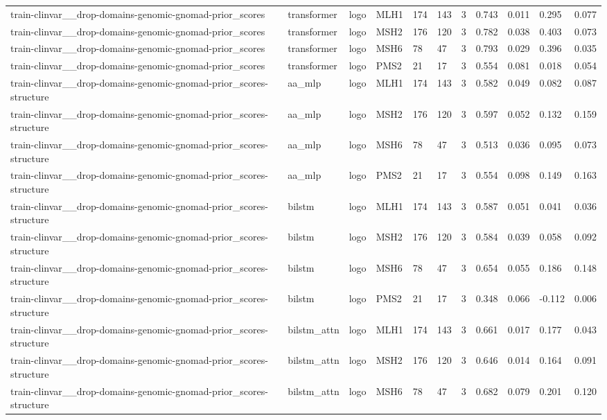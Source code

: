 \begin{table}[t]
\begin{tabular}{lllllllllll}
train-clinvar\_\_drop-domains-genomic-gnomad-prior\_scores & transformer & logo & MLH1 & 174 & 143 & 3 & 0.743 & 0.011 & 0.295 & 0.077 \\
train-clinvar\_\_drop-domains-genomic-gnomad-prior\_scores & transformer & logo & MSH2 & 176 & 120 & 3 & 0.782 & 0.038 & 0.403 & 0.073 \\
train-clinvar\_\_drop-domains-genomic-gnomad-prior\_scores & transformer & logo & MSH6 & 78 & 47 & 3 & 0.793 & 0.029 & 0.396 & 0.035 \\
train-clinvar\_\_drop-domains-genomic-gnomad-prior\_scores & transformer & logo & PMS2 & 21 & 17 & 3 & 0.554 & 0.081 & 0.018 & 0.054 \\
train-clinvar\_\_drop-domains-genomic-gnomad-prior\_scores-structure & aa\_mlp & logo & MLH1 & 174 & 143 & 3 & 0.582 & 0.049 & 0.082 & 0.087 \\
train-clinvar\_\_drop-domains-genomic-gnomad-prior\_scores-structure & aa\_mlp & logo & MSH2 & 176 & 120 & 3 & 0.597 & 0.052 & 0.132 & 0.159 \\
train-clinvar\_\_drop-domains-genomic-gnomad-prior\_scores-structure & aa\_mlp & logo & MSH6 & 78 & 47 & 3 & 0.513 & 0.036 & 0.095 & 0.073 \\
train-clinvar\_\_drop-domains-genomic-gnomad-prior\_scores-structure & aa\_mlp & logo & PMS2 & 21 & 17 & 3 & 0.554 & 0.098 & 0.149 & 0.163 \\
train-clinvar\_\_drop-domains-genomic-gnomad-prior\_scores-structure & bilstm & logo & MLH1 & 174 & 143 & 3 & 0.587 & 0.051 & 0.041 & 0.036 \\
train-clinvar\_\_drop-domains-genomic-gnomad-prior\_scores-structure & bilstm & logo & MSH2 & 176 & 120 & 3 & 0.584 & 0.039 & 0.058 & 0.092 \\
train-clinvar\_\_drop-domains-genomic-gnomad-prior\_scores-structure & bilstm & logo & MSH6 & 78 & 47 & 3 & 0.654 & 0.055 & 0.186 & 0.148 \\
train-clinvar\_\_drop-domains-genomic-gnomad-prior\_scores-structure & bilstm & logo & PMS2 & 21 & 17 & 3 & 0.348 & 0.066 & -0.112 & 0.006 \\
train-clinvar\_\_drop-domains-genomic-gnomad-prior\_scores-structure & bilstm\_attn & logo & MLH1 & 174 & 143 & 3 & 0.661 & 0.017 & 0.177 & 0.043 \\
train-clinvar\_\_drop-domains-genomic-gnomad-prior\_scores-structure & bilstm\_attn & logo & MSH2 & 176 & 120 & 3 & 0.646 & 0.014 & 0.164 & 0.091 \\
train-clinvar\_\_drop-domains-genomic-gnomad-prior\_scores-structure & bilstm\_attn & logo & MSH6 & 78 & 47 & 3 & 0.682 & 0.079 & 0.201 & 0.120 \\

\end{tabular}
\end{table}
